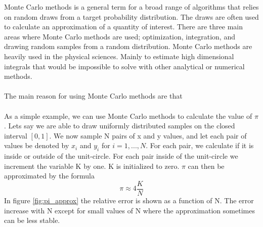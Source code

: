 Monte Carlo methods is a general term for a broad range of algorithms that relies on random draws from a target probability distribution. The draws are often used to calculate an approximation of a quantity of interest. There are three main areas where Monte Carlo methods are used; optimization, integration, and drawing random samples from a random distribution. Monte Carlo methods are heavily used in the physical sciences. Mainly to estimate high dimensional integrals that would be impossible to solve with other analytical or numerical methods. 
\\
\\
The main reason for using Monte Carlo methods are that  
\\
\\
As a simple example, we can use Monte Carlo methods to calculate the value of $\pi$. Lets say we are able to draw uniformly distributed samples on the closed interval $[0,1]$. We now sample N pairs of x and y values, and let each pair of values be denoted by $x_i$ and $y_i$ for $i=1,...,N$. For each pair, we calculate if it is inside or outside of the unit-circle. For each pair inside of the unit-circle we increment the variable K by one. K is initialized to zero. $\pi$ can then be approximated by the formula
\begin{equation}
    \pi \approx 4\frac{K}{N}
\end{equation}
In figure \ref{fig:pi_approx} the relative error is shown as a function of N. The error increase with N except for small values of N where the approximation sometimes can be less stable. 

